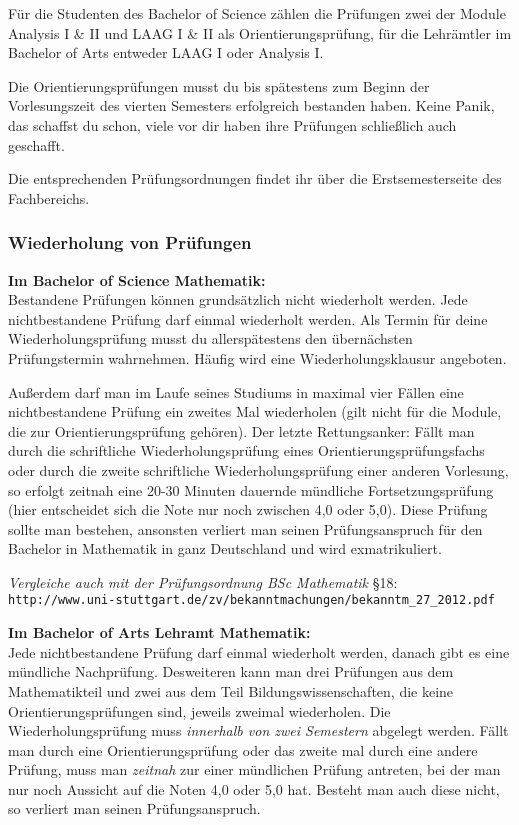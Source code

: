 Für die Studenten des Bachelor of Science
zählen die Prüfungen zwei der Module Analysis I \& II
und LAAG I \& II als Orientierungsprüfung,
für die Lehrämtler im Bachelor of Arts entweder LAAG I oder Analysis I.

Die Orientierungsprüfungen
musst du bis spätestens zum Beginn der Vorlesungszeit
des vierten Semesters erfolgreich bestanden haben.
Keine Panik, das schaffst du schon,
viele vor dir haben ihre Prüfungen
schließlich auch geschafft.

Die entsprechenden Prüfungsordnungen findet ihr über die
Erstsemesterseite des Fachbereichs. 

\subsubsection{Wiederholung von Prüfungen}\label{sssec:wi}

{\bf Im Bachelor of Science Mathematik:}\\
Bestandene Prüfungen können grundsätzlich nicht wiederholt werden.
Jede nichtbestandene Prüfung darf einmal wiederholt werden.
Als Termin für deine Wiederholungsprüfung
musst du allerspätestens den übernächsten Prüfungstermin wahrnehmen.
Häufig wird eine Wiederholungsklausur angeboten.

Außerdem darf man im Laufe seines Studiums
in maximal vier Fällen eine nichtbestandene Prüfung
ein zweites Mal wiederholen (gilt nicht für die Module,
die zur Orientierungsprüfung gehören).
Der letzte Rettungsanker:
Fällt man durch die schriftliche Wiederholungsprüfung
eines Orientierungsprüfungsfachs
oder durch die zweite schriftliche Wiederholungsprüfung
einer anderen Vorlesung, so erfolgt zeitnah eine 20-30 Minuten
dauernde mündliche Fortsetzungsprüfung (hier entscheidet sich die Note
nur noch zwischen 4,0 oder 5,0).
Diese Prüfung sollte man bestehen, ansonsten verliert man seinen Prüfungsanspruch
für den Bachelor in Mathematik
in ganz Deutschland und wird exmatrikuliert.

{\it Vergleiche auch mit der Prüfungsordnung BSc Mathematik} §18:\\
{\small
\verb|http://www.uni-stuttgart.de/zv/bekanntmachungen/bekanntm_27_2012.pdf|}

{\bf Im Bachelor of Arts Lehramt Mathematik:}\\
Jede nichtbestandene Prüfung darf einmal wiederholt werden,
danach gibt es eine mündliche Nachprüfung.
Desweiteren kann man drei Prüfungen aus dem Mathematikteil
und zwei aus dem Teil Bildungswissenschaften,
die keine Orientierungsprüfungen sind,
jeweils zweimal wiederholen.
Die Wiederholungsprüfung muss {\it innerhalb
von zwei Semestern} abgelegt werden.
Fällt man durch eine Orientierungsprüfung
oder das zweite mal durch eine andere Prüfung,
muss man {\it zeitnah} zur einer mündlichen Prüfung antreten,
bei der man nur noch Aussicht auf die Noten 4,0 oder 5,0 hat.
Besteht man auch diese nicht,
so verliert man seinen Prüfungsanspruch.

